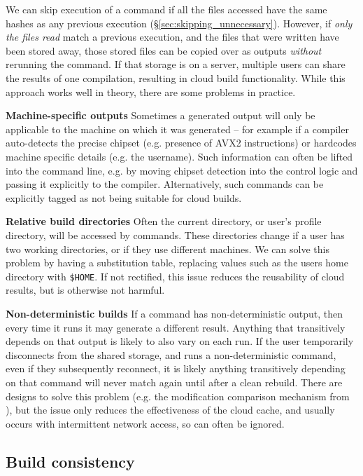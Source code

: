 We can skip execution of a command if all the files accessed have the same hashes as any previous execution (\S\ref{sec:skipping_unnecessary}). However, if \emph{only the files read} match a previous execution, and the files that were written have been stored away, those stored files can be copied over as outputs \emph{without} rerunning the command. If that storage is on a server, multiple users can share the results of one compilation, resulting in cloud build functionality. While this approach works well in theory, there are some problems in practice.

\textbf{Machine-specific outputs} Sometimes a generated output will only be applicable to the machine on which it was generated -- for example if a compiler auto-detects the precise chipset (e.g. presence of AVX2 instructions) or hardcodes machine specific details (e.g. the username). Such information can often be lifted into the command line, e.g. by moving chipset detection into the control logic and passing it explicitly to the compiler. Alternatively, such commands can be explicitly tagged as not being suitable for cloud builds.

\textbf{Relative build directories} Often the current directory, or user's profile directory, will be accessed by commands. These directories change if a user has two working directories, or if they use different machines. We can solve this problem by having a substitution table, replacing values such as the users home directory with \texttt{\$HOME}. If not rectified, this issue reduces the reusability of cloud results, but is otherwise not harmful.

\textbf{Non-deterministic builds} If a command has non-deterministic output, then every time it runs it may generate a different result. Anything that transitively depends on that output is likely to also vary on each run. If the user temporarily disconnects from the shared storage, and runs a non-deterministic command, even if they subsequently reconnect, it is likely anything transitively depending on that command will never match again until after a clean rebuild. There are designs to solve this problem (e.g. the modification comparison mechanism from \citet{erdweg2015sound}), but the issue only reduces the effectiveness of the cloud cache, and usually occurs with intermittent network access, so can often be ignored.

\subsection{Build consistency}
\label{sec:hazards}

